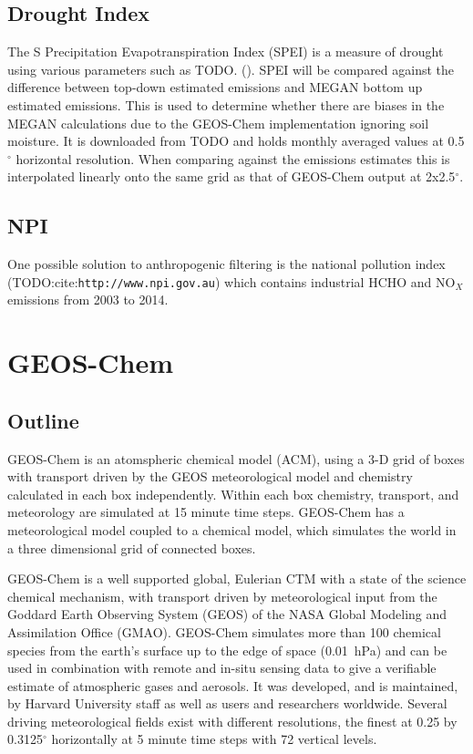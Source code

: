   \subsection{Drought Index}
    The S Precipitation Evapotranspiration Index (SPEI) is a measure of drought using various parameters such as TODO. (\textcite{Wang2017}).
    SPEI will be compared against the difference between top-down estimated emissions and MEGAN bottom up estimated emissions. 
    This is used to determine whether there are biases in the MEGAN calculations due to the GEOS-Chem implementation ignoring soil moisture.
    It is downloaded from TODO and holds monthly averaged values at 0.5$^{\circ}$ horizontal resolution.
    When comparing against the emissions estimates this is interpolated linearly onto the same grid as that of GEOS-Chem output at 2x2.5$^{\circ}$.
    
  \subsection{NPI}
    
    One possible solution to anthropogenic filtering is the national pollution index (TODO:cite:\verb|http://www.npi.gov.au|) which contains industrial HCHO and NO$_X$ emissions from 2003 to 2014.
  
\section{GEOS-Chem}
  \label{Model:GC}

  \subsection{Outline}
    GEOS-Chem is an atomspheric chemical model (ACM), using a 3-D grid of boxes with transport driven by the GEOS meteorological model and chemistry calculated in each box independently. 
    Within each box chemistry, transport, and meteorology are simulated at 15 minute time steps.
    GEOS-Chem has a meteorological model coupled to a chemical model, which simulates the world in a three dimensional grid of connected boxes.
    
    GEOS-Chem is a well supported global, Eulerian CTM with a state of the science chemical mechanism, with transport driven by meteorological input from the Goddard Earth Observing System (GEOS) of the NASA Global Modeling and Assimilation Office (GMAO).
    GEOS-Chem simulates more than 100 chemical species from the earth's surface up to the edge of space (0.01~hPa) and can be used in combination with remote and in-situ sensing data to give a verifiable estimate of atmospheric gases and aerosols.
    It was developed, and is maintained, by Harvard University staff as well as users and researchers worldwide.
    Several driving meteorological fields exist with different resolutions, the finest at 0.25 by 0.3125$^\circ$ horizontally at 5 minute time steps with 72 vertical levels.
    
